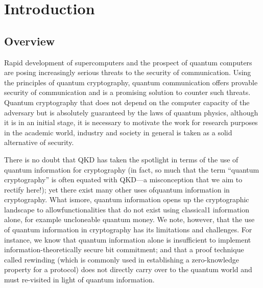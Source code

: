 \chapter{Introduction}
\label{chap:introduction}

\section{Overview}
Rapid development of supercomputers and the prospect of quantum computers are posing increasingly serious threats to the security of communication. Using the principles of quantum cryptography, quantum communication offers provable security of communication and is a promising solution to counter such threats. Quantum cryptography that does not depend on the computer capacity of the adversary but is absolutely guaranteed by the laws of quantum physics, although it is in an initial stage, it is necessary to motivate the work for research purposes in the academic world, industry and society in general is taken as a solid alternative of security.

There is no doubt that QKD has taken the spotlight in terms of the use of quantum information for cryptography (in fact, so much that the term “quantum cryptography” is often equated with QKD—a misconception that we aim to rectify here!); yet there exist many other uses ofquantum information in cryptography. What ismore, quantum information opens up the cryptographic landscape to allowfunctionalities that do not exist using classical1 information alone, for example uncloneable quantum money. We note, however, that the use of quantum information in cryptography has its limitations and challenges. For instance, we know that quantum information alone is insufficient to implement information-theoretically secure bit commitment; and that a proof technique called rewinding (which is commonly used in establishing a zero-knowledge property for a protocol) does not directly carry over to the quantum world and must re-visited in light of quantum information.





